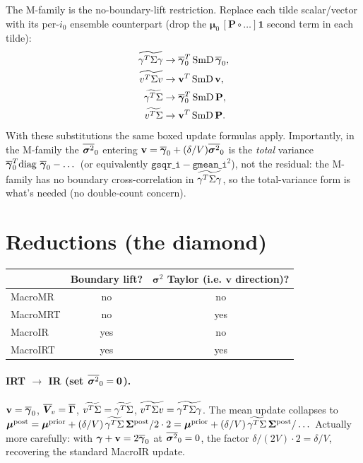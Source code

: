 \documentclass[11pt]{article}
\begin{document}
The M-family is the no-boundary-lift restriction. Replace each tilde
scalar/vector with its per-$i_0$ ensemble counterpart (drop the
$\boldsymbol{\mu}_0\,[\mathbf{P}\circ\dots]\mathbf{1}$ second term in
each tilde):
\begin{align}
  \widetilde{\gamma^{T}\Sigma\gamma} &\to \overline{\boldsymbol{\gamma}}_0^{T}\,\mathrm{SmD}\,\overline{\boldsymbol{\gamma}}_0,\\
  \widetilde{v^{T}\Sigma v} &\to \mathbf{v}^{T}\,\mathrm{SmD}\,\mathbf{v},\\
  \widetilde{\gamma^{T}\Sigma} &\to \overline{\boldsymbol{\gamma}}_0^{T}\,\mathrm{SmD}\,\mathbf{P},\\
  \widetilde{v^{T}\Sigma} &\to \mathbf{v}^{T}\,\mathrm{SmD}\,\mathbf{P}.
\end{align}
With these substitutions the same boxed update formulas apply. Importantly,
in the M-family the $\overline{\boldsymbol{\sigma}^2}_0$ entering $\mathbf{v}=\overline{\boldsymbol{\gamma}}_0 + (\delta/V)\overline{\boldsymbol{\sigma}^2}_0$
is the \emph{total} variance $\overline{\boldsymbol{\gamma}}_0^{T}\!\operatorname{diag}\,\overline{\boldsymbol{\gamma}}_0 - \dots$ (or
equivalently $\mathtt{gsqr\_i} - \mathtt{gmean\_i}^2$), not the residual:
the M-family has no boundary cross-correlation in $\widetilde{\gamma^{T}\Sigma\gamma}$, so the
total-variance form is what's needed (no double-count concern).

\section{Reductions (the diamond)}

\begin{center}
\begin{tabular}{l c c}
\toprule
& Boundary lift? & $\boldsymbol{\sigma}^2$ Taylor (i.e. $\mathbf{v}$ direction)? \\
\midrule
MacroMR  & no  & no \\
MacroMRT & no  & yes \\
MacroIR  & yes & no \\
MacroIRT & yes & yes \\
\bottomrule
\end{tabular}
\end{center}

\paragraph{IRT $\to$ IR (set $\overline{\boldsymbol{\sigma}^2}_0 = \mathbf{0}$).}
$\mathbf{v}=\overline{\boldsymbol{\gamma}}_0$, $\overline{\boldsymbol{V}}_{\!v}=\overline{\boldsymbol{\Gamma}}$, $\widetilde{v^{T}\Sigma}=\widetilde{\gamma^{T}\Sigma}$,
$\widetilde{v^{T}\Sigma v}=\widetilde{\gamma^{T}\Sigma\gamma}$. The mean update collapses to
$\boldsymbol{\mu}^{\mathrm{post}} = \boldsymbol{\mu}^{\mathrm{prior}} + (\delta/V)\,\widetilde{\gamma^{T}\Sigma}\,\boldsymbol{\Sigma}^{\mathrm{post}} / 2 \cdot 2 = \boldsymbol{\mu}^{\mathrm{prior}} + (\delta/V)\,\widetilde{\gamma^{T}\Sigma}\,\boldsymbol{\Sigma}^{\mathrm{post}} / \dots$
Actually more carefully: with $\boldsymbol{\gamma} + \mathbf{v} = 2\overline{\boldsymbol{\gamma}}_0$ at
$\overline{\boldsymbol{\sigma}^2}_0=0$, the factor $\delta/(2V) \cdot 2 = \delta/V$, recovering the
standard MacroIR update.
\end{document}
